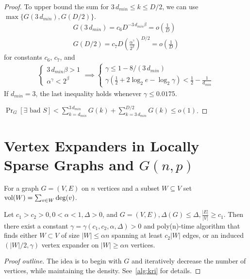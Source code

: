 \begin{proof}
    To upper bound the sum for $3\,d_{min}\leq k\leq D/2$,
    we can use $\max\{G(3\,d_{min}),G(D/2)\}$.
    \begin{gather}
        G(3\,d_{min})=c_6D^{-3\,d_{min}\beta}=o\left(\frac{1}{D}\right)\\
        G(D/2)=c_7D\left(\frac{\alpha^\gamma}{2^\beta}\right)^{D/2}=o\left(\frac{1}{D}\right)
    \end{gather}
    for constants $c_6$, $c_7$, and
    \begin{gather}
        \begin{cases}
            3\,d_{min}\beta>1\\
            \alpha^\gamma<2^\beta
        \end{cases}\implies
        \begin{cases}
            \gamma\leq1-8/(3\,d_{min})\\
            \gamma(\frac{1}{2}+2\log_2{e}-\log_2{\gamma})<\frac{1}{2}-\frac{1}{d_{min}}
        \end{cases}
    \end{gather}
    If $d_{min}=3$, the last inequality holds whenever $\gamma\leq 0.0175$.
    
    $\Pr_G[\exists\text{ bad }S]<\sum_{k=d_{min}}^{3\,d_{min}}{G(k)}
    +\sum_{k=3\,d_{min}}^{D/2}{G(k)}\leq o(1)$.
\end{proof}

\section{Vertex Expanders in Locally Sparse Graphs and \texorpdfstring{$G(n,p)$}{G(n,p)}}

For a graph $G=(V,E)$ on $n$ vertices and a subset $W\subseteq V$ set $\operatorname*{vol}(W)=\sum_{v\in W}\deg(v)$.

\begin{theorem}
    \label{thm:kri}
    Let $c_1>c_2>0, 0<\alpha<1, \Delta>0$, and
    $G=(V,E), \Delta(G)\leq\Delta,\frac{|E|}{|V|}\geq c_1$.
    Then there exist a constant $\gamma=\gamma(c_1,c_2,\alpha,\Delta)>0$
    and poly(n)-time algorithm that finds
    either $W\subset V$ of size $|W|\leq\alpha n$ spanning at least $c_2|W|$ edges,
    or an induced $(|W|/2,\gamma)$ vertex expander on $|W|\geq\alpha n$ vertices.
\end{theorem}

\begin{proof}[Proof outline]
    The idea is to begin with $G$ and iteratively decrease
    the number of vertices, while maintaining the density.
    See~\autoref{alg:kri} for details.
\end{proof}

